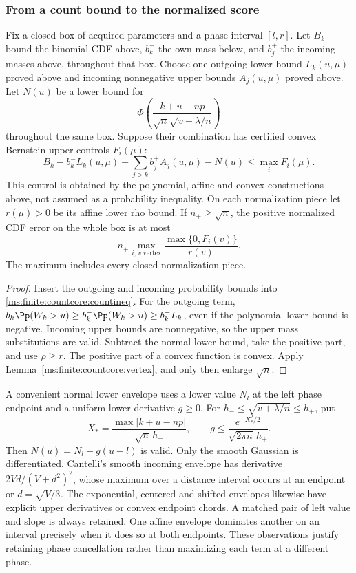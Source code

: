 \subsubsection{From a count bound to the normalized score}

\begin{theorem}
\label{ms:finite:countcore:scoretheorem}
Fix a closed box of acquired parameters and a phase interval \([l,r]\).
Let \(B_k\) bound the binomial CDF above, \(b_k^-\) the own mass
below, and \(b_j^+\) the incoming masses above, throughout that box.
Choose one outgoing lower bound \(L_k(u,\mu)\) proved above and
incoming nonnegative upper bounds \(A_j(u,\mu)\) proved above.
Let \(N(u)\) be a lower bound for
\[
 \Phi\left(\frac{k+u-np}{\sqrt n\sqrt{v+\lambda/n}}\right)
\]
throughout the same box. Suppose their combination has certified convex
Bernstein upper controls \(F_i(\mu)\):
\[
 B_k-b_k^-L_k(u,\mu)+\sum_{j>k}b_j^+A_j(u,\mu)-N(u)
 \le\max_i F_i(\mu).
\]
This control is obtained by the polynomial, affine and convex constructions
above, not assumed as a probability inequality. On each normalization
piece let \(r(\mu)>0\) be its affine lower rho bound. If \(n_+\ge\sqrt n\),
the positive normalized CDF error on the whole box is at most
\begin{equation}
 n_+\max_{i,\,v\ \mathrm{vertex}}
                  \frac{\max\{0,F_i(v)\}}{r(v)}.
 \label{ms:finite:countcore:scorebound}
\end{equation}
The maximum includes every closed normalization piece.
\end{theorem}
\begin{proof}
Insert the outgoing and incoming probability bounds into
\eqref{ms:finite:countcore:countineq}. For the outgoing term,
\(b_k\Pp(W_k>u)\ge b_k^-\Pp(W_k>u)\ge b_k^-L_k\),
even if the polynomial lower bound is negative. Incoming upper bounds
are nonnegative, so the upper mass substitutions are valid. Subtract
the normal lower bound, take the positive part, and use \(\rho\ge r\).
The positive part of a convex function is convex. Apply
Lemma~\ref{ms:finite:countcore:vertex}, and only then enlarge \(\sqrt n\).
\end{proof}

A convenient normal lower envelope uses a lower value \(N_l\) at the
left phase endpoint and a uniform lower derivative \(g\ge0\).
For \(h_-\le\sqrt{v+\lambda/n}\le h_+\), put
\[
 X_*=\frac{\max|k+u-np|}{\sqrt n\,h_-},\qquad
 g\le\frac{e^{-X_*^2/2}}{\sqrt{2\pi n}\,h_+}.
\]
Then \(N(u)=N_l+g(u-l)\) is valid. Only the smooth Gaussian is
differentiated. Cantelli's smooth incoming envelope has derivative
\(2Vd/(V+d^2)^2\), whose maximum over a distance interval occurs at
an endpoint or \(d=\sqrt{V/3}\). The exponential, centered and shifted
envelopes likewise have explicit upper derivatives or convex endpoint
chords. A matched pair of left value and slope is always retained.
One affine envelope dominates another on an interval precisely when it
does so at both endpoints. These observations justify retaining phase
cancellation rather than maximizing each term at a different phase.

